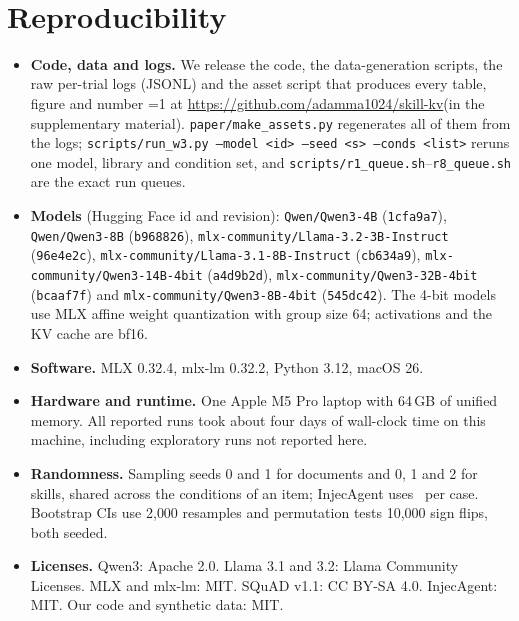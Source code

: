 \documentclass[10pt]{article}
\providecommand{\preprintmode}{0}
\newcommand{\cond}[1]{\textsf{#1}}
\newcommand{\coderef}{\ifnum\preprintmode=1 at \url{https://github.com/adamma1024/skill-kv}\else (in the supplementary material)\fi}
\begin{document}
\begin{table}[h]
\centering\small
\caption{Skills. Top: all-rules compliance (skill-clustered 95\% CIs). Bottom: per-rule pass rates, \cond{C1}
$\rightarrow$ \cond{C3}. The question never mentions the code line, sign-off or heading.}
\label{tab:skillrules}
\\[6pt]

\end{table}

\begin{table}[h]
\centering\small
\caption{Every skill contrast (positional grading unless noted).}
\label{tab:w2contrasts}

\end{table}

\section{Reproducibility}\label{app:repro}
\begin{itemize}
\item \textbf{Code, data and logs.} We release the code, the data-generation scripts, the raw per-trial logs (JSONL) and the asset
  script that produces every table, figure and number \coderef. \texttt{paper/make\_assets.py} regenerates all of them from the logs;
  \texttt{scripts/run\_w3.py --model <id> --seed <s> --conds <list>} reruns one model, library and condition set, and
  \texttt{scripts/r1\_queue.sh}--\texttt{r8\_queue.sh} are the exact run queues.
\item \textbf{Models} (Hugging Face id and revision): \texttt{Qwen/Qwen3-4B} (\texttt{1cfa9a7}), \texttt{Qwen/Qwen3-8B}
  (\texttt{b968826}), \texttt{mlx-community/Llama-3.2-3B-Instruct} (\texttt{96e4e2c}),
  \texttt{mlx-community/Llama-3.1-8B-Instruct} (\texttt{cb634a9}), \texttt{mlx-community/Qwen3-14B-4bit} (\texttt{a4d9b2d}),
  \texttt{mlx-community/Qwen3-32B-4bit} (\texttt{bcaaf7f}) and \texttt{mlx-community/Qwen3-8B-4bit} (\texttt{545dc42}). The 4-bit
  models use MLX affine weight quantization with group size 64; activations and the KV cache are bf16.
\item \textbf{Software.} MLX 0.32.4, mlx-lm 0.32.2, Python 3.12, macOS 26.
\item \textbf{Hardware and runtime.} One Apple M5 Pro laptop with 64\,GB of unified memory. All reported runs took about four days
  of wall-clock time on this machine, including exploratory runs not reported here.
\item \textbf{Randomness.} Sampling seeds 0 and 1 for documents and 0, 1 and 2 for skills, shared across the conditions of an
  item; InjecAgent uses \IaNseedsText\ per case. Bootstrap CIs use 2{,}000 resamples and permutation tests 10{,}000 sign flips, both
  seeded.
\item \textbf{Licenses.} Qwen3: Apache 2.0. Llama 3.1 and 3.2: Llama Community Licenses. MLX and mlx-lm: MIT. SQuAD v1.1: CC BY-SA
  4.0. InjecAgent: MIT. Our code and synthetic data: MIT.
\end{itemize}
\end{document}
